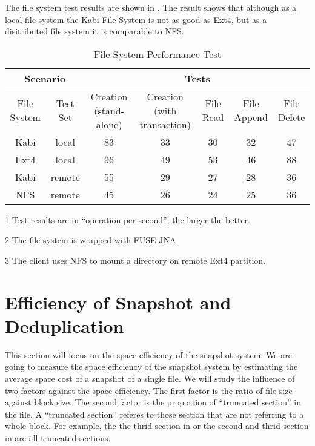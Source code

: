     The file system test results are shown in . The result shows that although as a local file system the Kabi File System is not as good as Ext4, but as a disitributed file system it is comparable to NFS.

\begin{lscape} 
\begin{table}
\caption{File System Performance Test}
\label{tab:fs_performance}
\begin{center}
\begin{threeparttable}
\begin{tabular}{|c|c|c|c|c|c|c|}
\hline
\multicolumn{2}{|c|}{Scenario} & \multicolumn{5}{c|}{Tests\tnote{1}} \\
\hline
File System & Test Set & Creation (stand-alone) & Creation (with transaction) & File Read & File Append & File Delete\\
\hline
Kabi & local & 83 & 33 & 30 & 32 & 47 \\
\hline
Ext4\tnote{2}& local & 96 & 49 & 53 & 46 & 88 \\
\hline
Kabi & remote & 55 & 29 & 27 & 28 & 36 \\
\hline
NFS \tnote{2,3} & remote & 45 & 26 & 24 & 25 & 36 \\
\hline
\end{tabular}
\begin{tablenotes}
\item[1] Test results are in ``operation per second'', the larger the better.
\item[2] The file system is wrapped with FUSE-JNA.
\item[3] The client uses NFS to mount a directory on remote Ext4 partition.
\end{tablenotes}
\end{threeparttable}
\end{center}
\end{table}
\end{lscape} 

\section {Efficiency of Snapshot and Deduplication}

    This section will focus on the space efficiency of the snapshot system. We are going to measure the space efficiency of the snapshot system by estimating the average space cost of a snapshot of a single file. We will study the influence of two factors against the space efficiency. The first factor is the ratio of file size against block size. The second factor is the proportion of ``truncated section'' in the file. A ``truncated section'' referes to those section that are not referring to a whole block. For example, the the thrid section in  or the second and thrid section in  are all truncated sections.

